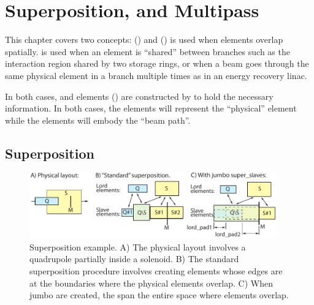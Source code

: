 \chapter{Superposition, and Multipass}
\label{c:super.multi}

This chapter covers two concepts:  () and 
()  is used when elements overlap spatially.   is
used when an element is ``shared'' between branches such as the interaction region shared by two
storage rings, or when a beam goes through the same physical element in a branch multiple times as
in an energy recovery linac.

In both cases,  and  elements () are constructed by \bmad to
hold the necessary information. In both cases, the  elements will represent the
``physical'' element while the  elements will embody the ``beam path''.

\section{Superposition}
\label{s:super}

  \begin{figure}[tb]
  \centering 
  \includegraphics[width=0.95\textwidth]{superimpose-example.pdf} 
  \caption[Superposition example.]
{Superposition example. A) The physical layout involves a quadrupole
partially inside a solenoid. B) The standard superposition procedure
involves creating  elements whose edges are at the
boundaries where the physical elements overlap. C) When jumbo
 are created, the  span the entire
space where elements overlap.}
  \label{f:super.ex}
  \end{figure}

